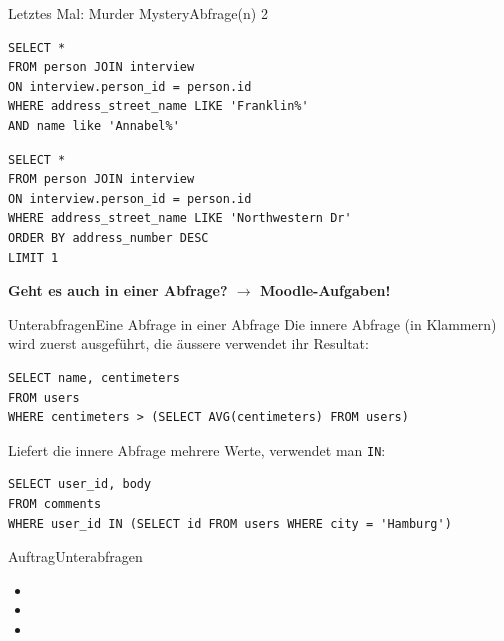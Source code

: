 \begin{frame}[fragile]{Letztes Mal: Murder Mystery}{Abfrage(n) 2}
\begin{lstlisting}
SELECT *
FROM person JOIN interview
ON interview.person_id = person.id
WHERE address_street_name LIKE 'Franklin%'
AND name like 'Annabel%'
\end{lstlisting}

\begin{lstlisting}
SELECT *
FROM person JOIN interview
ON interview.person_id = person.id
WHERE address_street_name LIKE 'Northwestern Dr'
ORDER BY address_number DESC
LIMIT 1
\end{lstlisting}

\begin{center}
\textbf{Geht es auch in einer Abfrage? $\rightarrow$ Moodle-Aufgaben!}
\end{center}
\end{frame}
\begin{frame}[fragile]{Unterabfragen}{Eine Abfrage in einer Abfrage}
  Die innere Abfrage (in Klammern) wird zuerst ausgeführt, die äussere verwendet ihr Resultat:
\begin{lstlisting}
SELECT name, centimeters
FROM users
WHERE centimeters > (SELECT AVG(centimeters) FROM users)
\end{lstlisting}
  Liefert die innere Abfrage mehrere Werte, verwendet man \lstinline|IN|:
\begin{lstlisting}
SELECT user_id, body
FROM comments
WHERE user_id IN (SELECT id FROM users WHERE city = 'Hamburg')
\end{lstlisting}
\end{frame}

\begin{frame}{Auftrag}{Unterabfragen}
  \begin{itemize}
    \item {}
    \item {}
    \item {}
  \end{itemize}
\end{frame}
